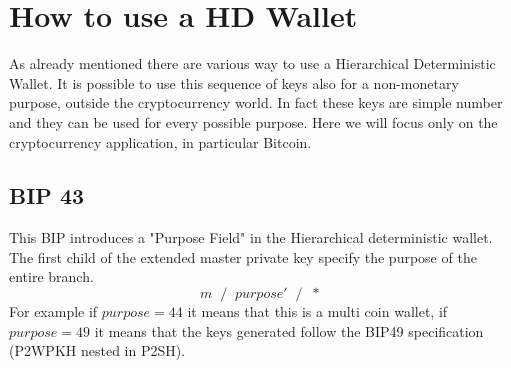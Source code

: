 
\chapter{How to use a HD Wallet} %

\label{bip32} %



As already mentioned there are various way to use a Hierarchical Deterministic Wallet. It is possible to use this sequence of keys also for a non-monetary purpose, outside the cryptocurrency world. In fact these keys are simple number and they can be used for every possible purpose. Here we will focus only on the cryptocurrency application, in particular Bitcoin.  
\section{BIP 43}
This BIP introduces a "Purpose Field" in the Hierarchical deterministic wallet. The first child of the extended master private key specify the purpose of the entire branch.
\begin{equation*}
m\; \;/\;\; purpose'\;\; /\;\; *
\end{equation*}
For example if $purpose=44$ it means that this is a multi coin wallet, if $purpose=49$ it means that the keys generated follow the BIP49 specification (P2WPKH nested in P2SH).

